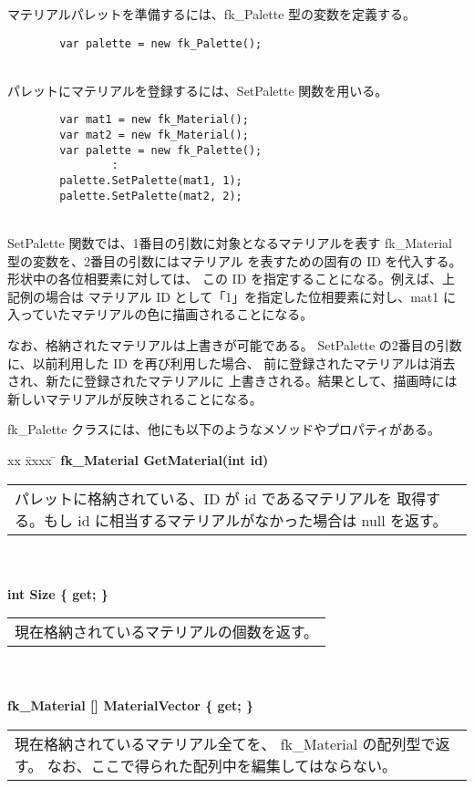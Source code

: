 マテリアルパレットを準備するには、fk\_Palette 型の変数を定義する。
\\
\begin{screen}
\begin{verbatim}
        var palette = new fk_Palette();
\end{verbatim}
\end{screen}
~ \\
パレットにマテリアルを登録するには、SetPalette 関数を用いる。
\\
\begin{screen}
\begin{verbatim}
        var mat1 = new fk_Material();
        var mat2 = new fk_Material();
        var palette = new fk_Palette();
                :
        palette.SetPalette(mat1, 1);
        palette.SetPalette(mat2, 2);
\end{verbatim}
\end{screen}
~ \\
SetPalette 関数では、1番目の引数に対象となるマテリアルを表す
fk\_Material 型の変数を、2番目の引数にはマテリアル
を表すための固有の ID を代入する。形状中の各位相要素に対しては、
この ID を指定することになる。例えば、上記例の場合は
マテリアル ID として「1」を指定した位相要素に対し、mat1 に
入っていたマテリアルの色に描画されることになる。

なお、格納されたマテリアルは上書きが可能である。
SetPalette の2番目の引数に、以前利用した ID を再び利用した場合、
前に登録されたマテリアルは消去され、新たに登録されたマテリアルに
上書きされる。結果として、描画時には新しいマテリアルが反映されることになる。

fk\_Palette クラスには、他にも以下のようなメソッドやプロパティがある。
\begin{tabbing}
xx \= xxxx \= \kill
\> \textbf{fk\_Material GetMaterial(int id)} \\
	\> \> \begin{tabular}{p{15cm}}
		パレットに格納されている、ID が id であるマテリアルを
		取得する。もし id に相当するマテリアルがなかった場合は
		null を返す。
	\end{tabular} \\ \\

\> \textbf{int Size \{ get; \} } \\
	\> \> \begin{tabular}{p{15cm}}
		現在格納されているマテリアルの個数を返す。
	\end{tabular} \\ \\

\> \textbf{fk\_Material [] MaterialVector \{ get; \} } \\
	\> \> \begin{tabular}{p{15cm}}
		現在格納されているマテリアル全てを、
		fk\_Material の配列型で返す。
		なお、ここで得られた配列中を編集してはならない。
	\end{tabular} \\ \\
\end{tabbing}

